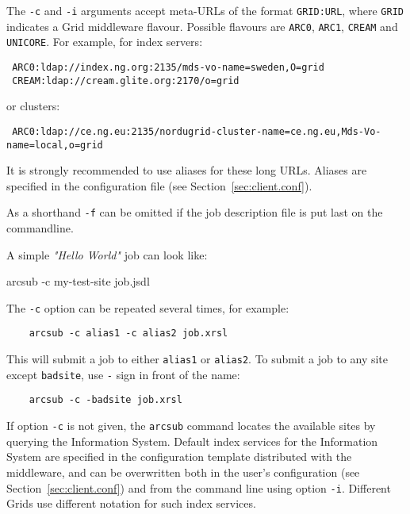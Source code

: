 \begin{framed}
The \verb#-c# and \verb#-i# arguments accept meta-URLs of the format \texttt{GRID:URL}, where \texttt{GRID} indicates a Grid middleware flavour. Possible flavours are \texttt{ARC0}, \texttt{ARC1}, \texttt{CREAM} and \texttt{UNICORE}. For example, for index servers:
\begin{verbatim}
 ARC0:ldap://index.ng.org:2135/mds-vo-name=sweden,O=grid
 CREAM:ldap://cream.glite.org:2170/o=grid
\end{verbatim}
or clusters:

\verb# ARC0:ldap://ce.ng.eu:2135/nordugrid-cluster-name=ce.ng.eu,Mds-Vo-name=local,o=grid#

It is strongly recommended to use aliases for these long URLs. Aliases are specified in the configuration file (see Section~\ref{sec:client.conf}).
\end{framed}

As a shorthand \texttt{-f} can be omitted if the job description file is put last on the commandline.

A simple \textit{"Hello World"} job can look like:

\begin{shaded}
 arcsub -c my-test-site job.jsdl
\end{shaded}

The \verb#-c# option can be repeated several times, for example:
\begin{verbatim}
    arcsub -c alias1 -c alias2 job.xrsl
\end{verbatim}
This will submit a job to either \verb#alias1# or \verb#alias2#. To submit a job to any site except
\verb#badsite#, use \verb#-# sign in front of the name:
\begin{verbatim}
    arcsub -c -badsite job.xrsl
\end{verbatim}

If option \verb#-c# is not given, the \verb#arcsub# command locates the available sites by querying the
Information System. Default index services for the Information System are specified in the
configuration template distributed with the middleware, and can be overwritten both in the user's
configuration (see Section~\ref{sec:client.conf}) and from the command line using option
\verb#-i#. Different Grids use different notation for such index services.

